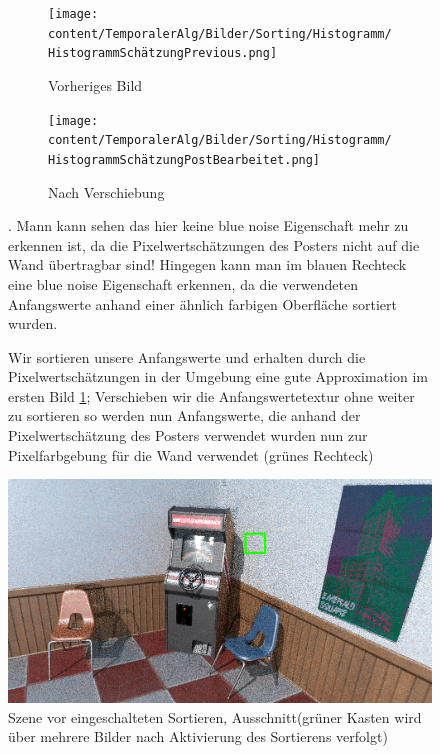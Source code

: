 \begin{figure}[H]
    \centering
    \begin{subfigure}{0.4\textwidth}
        \centering\texttt{[image: content/TemporalerAlg/Bilder/Sorting/Histogramm/HistogrammSchätzungPrevious.png]} 
        \caption{Vorheriges Bild}
        \label{fig:Histogramm_Previous}
    \end{subfigure}
    \centering
    \begin{subfigure}{0.4\textwidth}
        \centering\texttt{[image: content/TemporalerAlg/Bilder/Sorting/Histogramm/HistogrammSchätzungPostBearbeitet.png]}
        \caption{Nach Verschiebung}
        \label{fig:Histogram_Post}
    \end{subfigure}
    \caption{Wir sortieren unsere Anfangswerte und erhalten durch die Pixelwertschätzungen in der Umgebung eine gute Approximation im ersten Bild
    \ref{fig:Histogramm_Previous}; Verschieben wir die Anfangswertetextur ohne weiter zu sortieren so werden nun Anfangswerte, die anhand der Pixelwertschätzung des
    Posters verwendet wurden nun zur Pixelfarbgebung für die Wand verwendet (grünes Rechteck)}. Mann kann sehen das hier keine blue noise Eigenschaft mehr zu erkennen
    ist, da die Pixelwertschätzungen des Posters nicht auf die Wand übertragbar sind! Hingegen kann man im blauen Rechteck eine blue noise Eigenschaft erkennen, da 
    die verwendeten Anfangswerte anhand einer ähnlich farbigen Oberfläche sortiert wurden. 
    \label{fig:Vergleich der Histogramme}
\end{figure}


\newpage

\begin{figure}[H]
        \centering \includegraphics[scale=.25]{content/TemporalerAlg/Bilder/Sorting/Szene/Szene1.png}
        \caption{Szene vor eingeschalteten Sortieren, Ausschnitt(grüner Kasten wird über mehrere 
        Bilder nach Aktivierung des Sortierens verfolgt)}
        \label{fig:Nur_Sorting_Szene_t1}
\end{figure}

